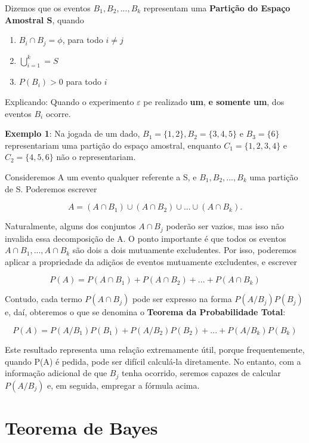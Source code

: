 Dizemos que os eventos $B_{1},B_{2},...,B_{k}$ representam uma
\textbf{Partição do Espaço Amostral S}, quando

\begin{enumerate}
    \item $B_{i} \cap B_{j}=\phi$, para todo $i\neq j$
    \item $\bigcup^{k}_{i=1}=S$
    \item $P(B_{i})>0$ para todo $i$
\end{enumerate}

Explicando: Quando o experimento $\varepsilon$ pe realizado
\textbf{um}, \textbf{e somente um}, dos eventos $B_{i}$
ocorre.\vskip0.3cm

\textbf{Exemplo 1}: Na jogada de um dado,
$B_{1}=\{1,2\},B_{2}=\{3,4,5 \}$ e $B_{3}=\{6\}$ representariam
uma partição do espaço amostral, enquanto $C_{1}=\{1,2,3,4\}$ e
$C_{2}=\{4,5,6 \}$ não o representariam.\vskip0.3cm

Consideremos A um evento qualquer referente a S, e
$B_{1},B_{2},...,B_{k}$ uma partição de S. Poderemos escrever

$$
A = (A \cap B_{1}) \cup (A \cap B_{2}) \cup ... \cup (A \cap
B_{k}).
$$

Naturalmente, alguns dos conjuntos $A \cap B_{j}$ poderão ser
vazios, mas isso não invalida essa decomposição de A. O ponto
importante é que todos os eventos $A \cap B_{1},...,A \cap B_{k}$
são dois a dois mutuamente excludentes. Por isso, poderemos
aplicar a propriedade da adiçãos de eventos mutuamente
excludentes, e escrever


$$
P(A)=P(A\cap B_{1})+P(A\cap B_{2})+...+P(A\cap B_{k})
$$

Contudo, cada termo $P(A\cap B_{j})$ pode ser expresso na forma
$P(A/B_{j})P(B_{j})$ e, daí, obteremos o que se denomina o
\textbf{Teorema da Probabilidade Total}:

\begin{equation}\label{}
P(A)=P(A/B_{1})P(B_{1})+P(A/B_{2})P(B_{2})+...+P(A/B_{k})P(B_{k})
\end{equation}

Este resultado representa uma relação extremamente útil, porque
frequentemente, quando P(A) é pedida, pode ser difícil calculá-la
diretamente. No entanto, com a informação adicional de que $B_{j}$
tenha ocorrido, seremos capazes de calcular $P(A/B_{j})$ e, em
seguida, empregar a fórmula acima.


\section{Teorema de Bayes}
